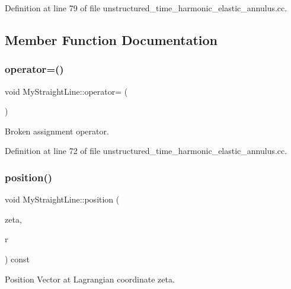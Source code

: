Definition at line 79 of file unstructured\+\_\+time\+\_\+harmonic\+\_\+elastic\+\_\+annulus.\+cc.



\subsection{Member Function Documentation}
\mbox{\label{classMyStraightLine_a926ab921fec52ded94509efce06b66a7}} 
\subsubsection{\texorpdfstring{operator=()}{operator=()}}
{\footnotesize\ttfamily void My\+Straight\+Line\+::operator= (\begin{DoxyParamCaption}\item[{const \hyperlink{classMyStraightLine}{My\+Straight\+Line} \&}]{ }\end{DoxyParamCaption})\hspace{0.3cm}{\ttfamily [inline]}}



Broken assignment operator. 



Definition at line 72 of file unstructured\+\_\+time\+\_\+harmonic\+\_\+elastic\+\_\+annulus.\+cc.

\mbox{\label{classMyStraightLine_ae3ee51a7b81acc2ef652bec4ee955d2f}} 
\subsubsection{\texorpdfstring{position()}{position()}}
{\footnotesize\ttfamily void My\+Straight\+Line\+::position (\begin{DoxyParamCaption}\item[{const Vector$<$ double $>$ \&}]{zeta,  }\item[{Vector$<$ double $>$ \&}]{r }\end{DoxyParamCaption}) const\hspace{0.3cm}{\ttfamily [inline]}}



Position Vector at Lagrangian coordinate zeta. 



